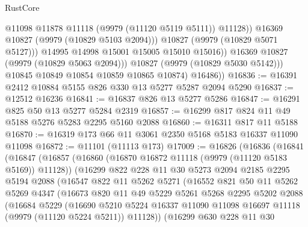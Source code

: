 \begin{lexlean}{RustCore}
\begin{coremodule}
                          @11098
                          @11878
                          @11118
                          (@9979 (@11120 @5119 @5111))
                          @11128))
                      @16369
                      @10827
                      (@9979 (@10829 @5103 @2094)))
                    @10827
                    (@9979 (@10829 @5071 @5127)))
                  @14995
                  @14998
                  @15001
                  @15005
                  @15010
                  @15016))
              @16369
              @10827
              (@9979 (@10829 @5063 @2094)))
            @10827
            (@9979 (@10829 @5030 @5142)))
          @10845
          @10849
          @10854
          @10859
          @10865
          @10874)
        @16486))
@16836 := @16391 @2412 @10884 @5155 @826 @330 @13 @5277 @5287 @2094 @5290
@16837 := @12512 @16236
@16841 := @16837 @826 @13 @5277 @5286
@16847 := @16291 @825 @50 @13 @5277 @5284 @2319
@16857 := @16299 @817 @824 @11 @49 @5188 @5276 @5283 @2295 @5160 @2088
@16860 := @16311 @817 @11 @5188
@16870 := @16319 @173 @66 @11 @3061 @2350 @5168 @5183 @16337 @11090 @11098
@16872 := @11101 (@11113 @173)
@17009 := @16826
    (@16836
      (@16841
        (@16847
          (@16857
            (@16860 (@16870 @16872 @11118 (@9979 (@11120 @5183 @5169)) @11128))
            (@16299
              @822
              @228
              @11
              @30
              @5273
              @2094
              @2185
              @2295
              @5194
              @2088
              (@16547
                @822
                @11
                @5262
                @5271
                (@16552
                  @821
                  @50
                  @11
                  @5262
                  @5269
                  @4347
                  (@16673
                    @820
                    @11
                    @49
                    @5229
                    @5261
                    @5268
                    @2295
                    @5202
                    @2088
                    (@16684
                      @5229
                      (@16690
                        @5210
                        @5224
                        @16337
                        @11090
                        @11098
                        @16697
                        @11118
                        (@9979 (@11120 @5224 @5211))
                        @11128))
                    (@16299
                      @630
                      @228
                      @11
                      @30

\end{coremodule}
\end{lexlean}
